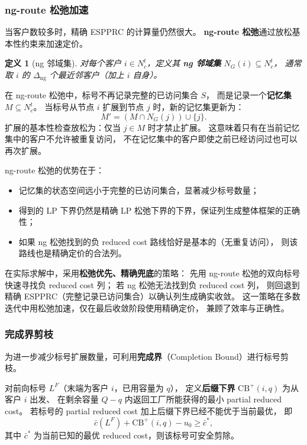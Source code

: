 \documentclass{article}
\newtheorem{definition}{定义}
\begin{document}
\subsubsection{ng-route 松弛加速}
\label{sec:ng_relaxation}

当客户数较多时，精确 ESPPRC 的计算量仍然很大。
\textbf{ng-route 松弛}通过放松基本性约束来加速定价。

\begin{definition}[ng 邻域集]
对每个客户 $i \in N_c^t$，定义其 \textbf{ng 邻域集} $N_G(i) \subseteq N_c^t$，
通常取 $i$ 的 $\Delta_{\text{ng}}$ 个最近邻客户（加上 $i$ 自身）。
\end{definition}

在 ng-route 松弛中，标号不再记录完整的已访问集合 $S$，
而是记录一个\textbf{记忆集} $M \subseteq N_c^t$。
当标号从节点 $i$ 扩展到节点 $j$ 时，新的记忆集更新为：
\begin{equation}
M' = (M \cap N_G(j)) \cup \{j\}.
\end{equation}
扩展的基本性检查放松为：仅当 $j \in M$ 时才禁止扩展。
这意味着只有在当前记忆集中的客户不允许被重复访问，
不在记忆集中的客户即使之前已经访问过也可以再次扩展。

ng-route 松弛的优势在于：
\begin{itemize}[leftmargin=2em]
  \item 记忆集的状态空间远小于完整的已访问集合，显著减少标号数量；
  \item 得到的 LP 下界仍然是精确 LP 松弛下界的下界，保证列生成整体框架的正确性；
  \item 如果 ng 松弛找到的负 reduced cost 路线恰好是基本的（无重复访问），
        则该路线也是精确定价的合法列。
\end{itemize}

在实际求解中，采用\textbf{松弛优先、精确兜底}的策略：
先用 ng-route 松弛的双向标号快速寻找负 reduced cost 列；
若 ng 松弛无法找到负 reduced cost 列，
则回退到精确 ESPPRC（完整记录已访问集合）以确认列生成确实收敛。
这一策略在多数迭代中用松弛加速，仅在最后收敛阶段使用精确定价，
兼顾了效率与正确性。

\subsubsection{完成界剪枝}
\label{sec:completion_bound}

为进一步减少标号扩展数量，可利用\textbf{完成界}（Completion Bound）进行标号剪枝。

对前向标号 $L^F$（末端为客户 $i$，已用容量为 $q$），
定义\textbf{后缀下界} $\text{CB}^+(i, q)$ 为从客户 $i$ 出发、
在剩余容量 $Q - q$ 内返回工厂所能获得的最小 partial reduced cost。
若标号的 partial reduced cost 加上后缀下界已经不能优于当前最优，
即
\begin{equation}
\bar{c}(L^F) + \text{CB}^+(i, q) - u_0 \ge \bar{c}^*,
\end{equation}
其中 $\bar{c}^*$ 为当前已知的最优 reduced cost，则该标号可安全剪除。
\end{document}
